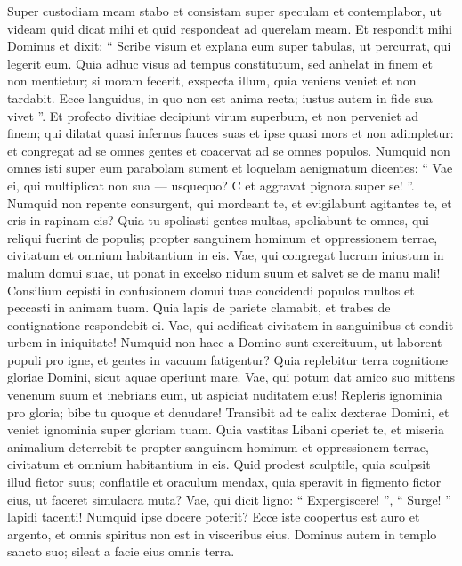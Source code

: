 \begin{biblechapter}
\begin{biblechapter}
 \verse Super custodiam meam stabo
 et consistam super speculam
 et contemplabor, ut videam quid dicat mihi
 et quid respondeat ad querelam meam.
 \verse Et respondit mihi Dominus et dixit:
 “ Scribe visum
 et explana eum super tabulas,
 ut percurrat, qui legerit eum.
 \verse Quia adhuc visus ad tempus constitutum,
 sed anhelat in finem et non mentietur;
 si moram fecerit, exspecta illum,
 quia veniens veniet et non tardabit.
 \verse Ecce languidus, in quo non est anima recta;
 iustus autem in fide sua vivet ”.
 \verse Et profecto divitiae decipiunt virum superbum,
 et non perveniet ad finem;
 qui dilatat quasi infernus fauces suas
 et ipse quasi mors et non adimpletur:
 et congregat ad se omnes gentes
 et coacervat ad se omnes populos.
 \verse Numquid non omnes isti super eum parabolam sument
 et loquelam aenigmatum dicentes:
 “ Vae ei, qui multiplicat non sua — usquequo? C
 et aggravat pignora super se! ”.
 \verse Numquid non repente consurgent, qui mordeant te,
 et evigilabunt agitantes te,
 et eris in rapinam eis?
 \verse Quia tu spoliasti gentes multas,
 spoliabunt te omnes, qui reliqui fuerint de populis;
 propter sanguinem hominum et oppressionem terrae,
 civitatum et omnium habitantium in eis.
 \verse Vae, qui congregat lucrum iniustum in malum domui suae,
 ut ponat in excelso nidum suum
 et salvet se de manu mali!
 \verse Consilium cepisti in confusionem domui tuae
 concidendi populos multos
 et peccasti in animam tuam.
 \verse Quia lapis de pariete clamabit,
 et trabes de contignatione respondebit ei.
 \verse Vae, qui aedificat civitatem in sanguinibus
 et condit urbem in iniquitate!
 \verse Numquid non haec a Domino sunt exercituum,
 ut laborent populi pro igne,
 et gentes in vacuum fatigentur?
 \verse Quia replebitur terra cognitione gloriae Domini,
 sicut aquae operiunt mare.
 \verse Vae, qui potum dat amico suo
 mittens venenum suum et inebrians eum,
 ut aspiciat nuditatem eius!
 \verse Repleris ignominia pro gloria;
 bibe tu quoque et denudare!
 Transibit ad te calix dexterae Domini,
 et veniet ignominia super gloriam tuam.
 \verse Quia vastitas Libani operiet te,
 et miseria animalium deterrebit te
 propter sanguinem hominum et oppressionem terrae,
 civitatum et omnium habitantium in eis.
 \verse Quid prodest sculptile,
 quia sculpsit illud fictor suus;
 conflatile et oraculum mendax,
 quia speravit in figmento fictor eius, ut faceret simulacra muta?
 \verse Vae, qui dicit ligno: “ Expergiscere! ”, “ Surge! ” lapidi tacenti!
 Numquid ipse docere poterit?
 Ecce iste coopertus est auro et argento,
 et omnis spiritus non est in visceribus eius.
 \verse Dominus autem in templo sancto suo; sileat a facie eius omnis terra.
 

\end{biblechapter}
\end{biblechapter}
